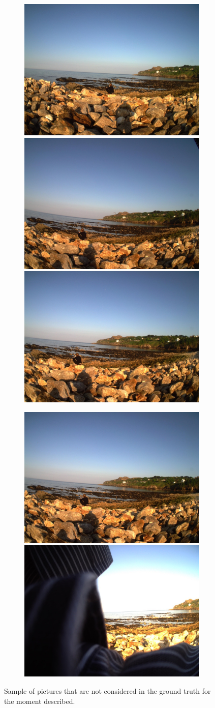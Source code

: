         \begin{figure}[H]
            \centering
            \captionsetup{justification=centering}
            \begin{subfigure}{\linewidth}
            \includegraphics[width=.3\linewidth]{Sections/5ImageClef/images/a.jpg}
            \includegraphics[width=.3\linewidth]{Sections/5ImageClef/images/b.jpg}
            \includegraphics[width=.3\linewidth]{Sections/5ImageClef/images/c.jpg}
            \end{subfigure}\par\medskip
            \begin{subfigure}{\linewidth}
                \hspace{2.2cm}
            \includegraphics[width=.3\linewidth]{Sections/5ImageClef/images/d.jpg}
            \includegraphics[width=.3\linewidth]{Sections/5ImageClef/images/e.jpg}
            \end{subfigure}\par\medskip
            \caption{Sample of pictures that are not considered in the ground truth for the moment described.}
            \label{fig:images_notgt}
          \end{figure}
   
